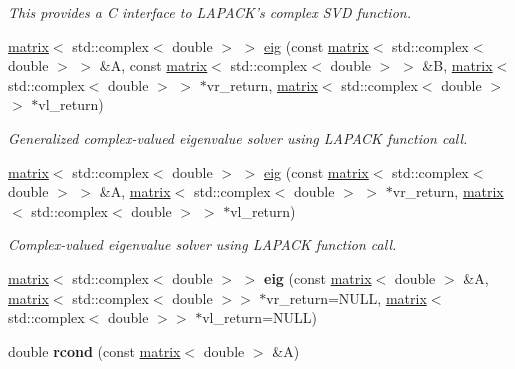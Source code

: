 \begin{DoxyCompactItemize}
\begin{DoxyCompactList}\small\item\em This provides a C interface to L\-A\-P\-A\-C\-K's complex S\-V\-D function. \end{DoxyCompactList}\item 
\hyperlink{classkeycpp_1_1matrix}{matrix}$<$ std\-::complex$<$ double $>$ $>$ \hyperlink{namespacekeycpp_aef2cabbae720e89202edc998eb6cbfec}{eig} (const \hyperlink{classkeycpp_1_1matrix}{matrix}$<$ std\-::complex$<$ double $>$ $>$ \&A, const \hyperlink{classkeycpp_1_1matrix}{matrix}$<$ std\-::complex$<$ double $>$ $>$ \&B, \hyperlink{classkeycpp_1_1matrix}{matrix}$<$ std\-::complex$<$ double $>$ $>$ $\ast$vr\-\_\-return, \hyperlink{classkeycpp_1_1matrix}{matrix}$<$ std\-::complex$<$ double $>$ $>$ $\ast$vl\-\_\-return)
\begin{DoxyCompactList}\small\item\em Generalized complex-\/valued eigenvalue solver using L\-A\-P\-A\-C\-K function call. \end{DoxyCompactList}\item 
\hyperlink{classkeycpp_1_1matrix}{matrix}$<$ std\-::complex$<$ double $>$ $>$ \hyperlink{namespacekeycpp_ae8be23e99e5aab35207275afc0d43a57}{eig} (const \hyperlink{classkeycpp_1_1matrix}{matrix}$<$ std\-::complex$<$ double $>$ $>$ \&A, \hyperlink{classkeycpp_1_1matrix}{matrix}$<$ std\-::complex$<$ double $>$ $>$ $\ast$vr\-\_\-return, \hyperlink{classkeycpp_1_1matrix}{matrix}$<$ std\-::complex$<$ double $>$ $>$ $\ast$vl\-\_\-return)
\begin{DoxyCompactList}\small\item\em Complex-\/valued eigenvalue solver using L\-A\-P\-A\-C\-K function call. \end{DoxyCompactList}\item 
\hypertarget{namespacekeycpp_a0634c813880b20cecb300509be839a94}{\hyperlink{classkeycpp_1_1matrix}{matrix}$<$ std\-::complex$<$ double $>$ $>$ {\bfseries eig} (const \hyperlink{classkeycpp_1_1matrix}{matrix}$<$ double $>$ \&A, \hyperlink{classkeycpp_1_1matrix}{matrix}$<$ std\-::complex$<$ double $>$$>$ $\ast$vr\-\_\-return=N\-U\-L\-L, \hyperlink{classkeycpp_1_1matrix}{matrix}$<$ std\-::complex$<$ double $>$$>$ $\ast$vl\-\_\-return=N\-U\-L\-L)}\label{namespacekeycpp_a0634c813880b20cecb300509be839a94}

\item 
\hypertarget{namespacekeycpp_a3905cfc35dbd146f5dbf7bcb5729c2c2}{double {\bfseries rcond} (const \hyperlink{classkeycpp_1_1matrix}{matrix}$<$ double $>$ \&A)}\label{namespacekeycpp_a3905cfc35dbd146f5dbf7bcb5729c2c2}


\end{DoxyCompactItemize}
